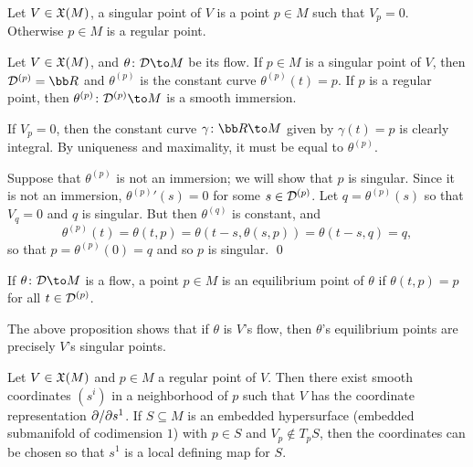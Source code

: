 \eproof

\bdefn

    Let $V\in{\frak X}(M)$, a {\emphcolor singular point} of $V$ is a point $p\in M$ such that $V_p=0$.
    Otherwise $p\in M$ is a {\emphcolor regular point}.

\edefn

\bprop

    Let $V\in{\frak X}(M)$, and $\theta\colon\D\to M$ be its flow.
    If $p\in M$ is a singular point of $V$, then $\D^{(p)}=\bR$ and $\theta^{(p)}$ is the constant curve $\theta^{(p)}(t)=p$.
    If $p$ is a regular point, then $\theta^{(p)}\colon\D^{(p)}\to M$ is a smooth immersion.

\eprop

\bproof

    If $V_p=0$, then the constant curve $\gamma\colon\bR\to M$ given by $\gamma(t)=p$ is clearly integral.
    By uniqueness and maximality, it must be equal to $\theta^{(p)}$.

    Suppose that $\theta^{(p)}$ is not an immersion; we will show that $p$ is singular.
    Since it is not an immersion, ${\theta^{(p)}}'(s)=0$ for some $s\in{{\cal D}}^{(p)}$.
    Let $q=\theta^{(p)}(s)$ so that $V_q=0$ and $q$ is singular.
    But then $\theta^{(q)}$ is constant, and
    $$ \theta^{(p)}(t) = \theta(t,p) = \theta(t-s,\theta(s,p)) = \theta(t-s,q) = q, $$
    so that $p=\theta^{(p)}(0)=q$ and so $p$ is singular.
    \qed

\eproof

\bdefn

    If $\theta\colon\D\to M$ is a flow, a point $p\in M$ is an {\emphcolor equilibrium point} of $\theta$ if $\theta(t,p)=p$ for all $t\in{{\cal D}}^{(p)}$.

\edefn

The above proposition shows that if $\theta$ is $V$'s flow, then $\theta$'s equilibrium points are precisely $V$'s singular points.

\bthrm[title=Canonical form of flow]

    Let $V\in{\frak X}(M)$ and $p\in M$ a regular point of $V$.
    Then there exist smooth coordinates $(s^i)$ in a neighborhood of $p$ such that $V$ has the coordinate representation $\partial /\partial s^1$.
    If $S\subseteq M$ is an embedded hypersurface (embedded submanifold of codimension $1$) with $p\in S$ and $V_p\notin T_pS$, then the coordinates can
    be chosen so that $s^1$ is a local defining map for $S$.

\ethrm

\bnote

